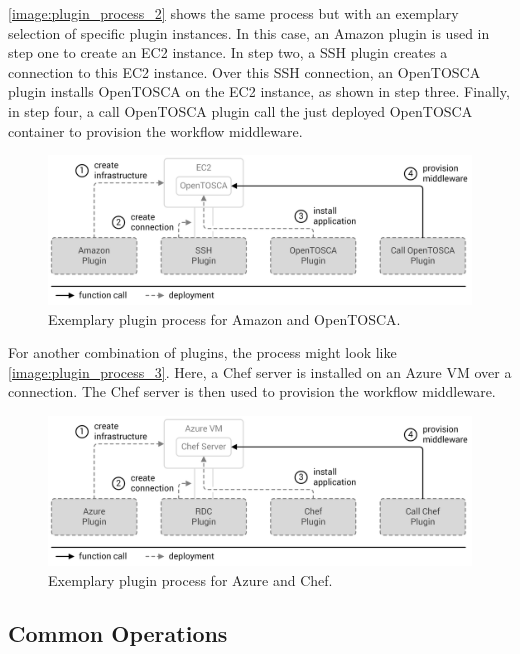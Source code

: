 \autoref{image:plugin_process_2} shows the same process but with an exemplary selection of specific plugin instances.
In this case, an Amazon plugin is used in step one to create an EC2 instance.
In step two, a SSH plugin creates a connection to this EC2 instance.
Over this SSH connection, an OpenTOSCA plugin installs OpenTOSCA on the EC2 instance, as shown in step three.
Finally, in step four, a call OpenTOSCA plugin call the just deployed OpenTOSCA container to provision the workflow middleware.

\begin{figure}[!htbp]
	\centering
	\includegraphics[resolution=600]{design/assets/plugin_process_2}
	\caption{Exemplary plugin process for Amazon and OpenTOSCA.}
	\label{image:plugin_process_2}
\end{figure}

For another combination of plugins, the process might look like \autoref{image:plugin_process_3}.
Here, a Chef server is installed on an Azure VM over a  connection.
The Chef server is then used to provision the workflow middleware.

\begin{figure}[!htbp]
	\centering
	\includegraphics[resolution=600]{design/assets/plugin_process_3}
	\caption{Exemplary plugin process for Azure and Chef.}
	\label{image:plugin_process_3}
\end{figure}

\subsection{Common Operations}

